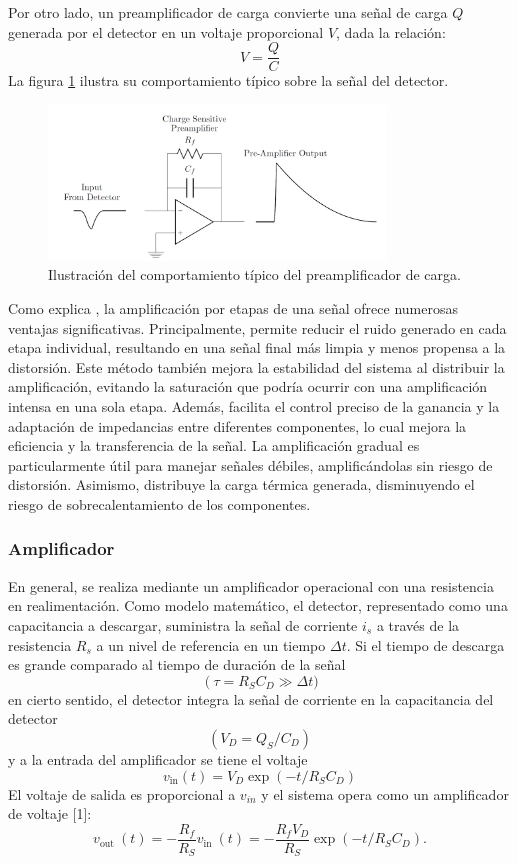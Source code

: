 \documentclass[]{book}
\begin{document}
\noindent Por otro lado, un preamplificador de carga convierte una señal de carga $Q$ generada por el detector en un voltaje proporcional $V$, dada la relación: $$V = \frac{Q}{C}$$ La figura \ref{fig:preamp} ilustra su comportamiento típico sobre la señal del detector.\\

\begin{figure}[h]
    \centering
    \includegraphics[width=0.8\textwidth]{preamp.PNG}
    \caption{Ilustración del comportamiento típico del preamplificador de carga.}
    \label{fig:preamp}

\end{figure}

\noindent Como explica \cite{proakis2007digital}, la amplificación por etapas de una señal ofrece numerosas ventajas significativas. Principalmente, permite reducir el ruido generado en cada etapa individual, resultando en una señal final más limpia y menos propensa a la distorsión. Este método también mejora la estabilidad del sistema al distribuir la amplificación, evitando la saturación que podría ocurrir con una amplificación intensa en una sola etapa. Además, facilita el control preciso de la ganancia y la adaptación de impedancias entre diferentes componentes, lo cual mejora la eficiencia y la transferencia de la señal. La amplificación gradual es particularmente útil para manejar señales débiles, amplificándolas sin riesgo de distorsión. Asimismo, distribuye la carga térmica generada, disminuyendo el riesgo de sobrecalentamiento de los componentes. \\

\subsubsection{Amplificador}

\noindent En general, se realiza mediante un amplificador operacional con una resistencia en realimentación. Como modelo matemático, el detector, representado como una capacitancia a descargar, suministra la señal de corriente $i_{s}$ a través de la resistencia $R_{s}$ a un nivel de referencia en un tiempo $\Delta t$. Si el tiempo de descarga es grande comparado al tiempo de duración de la señal $$\left(\tau=R_S C_D \gg\right. \Delta t)$$ en cierto sentido, el detector integra la señal de corriente en la capacitancia del detector $$\left(V_D=Q_S / C_D\right)$$ y a la entrada del amplificador se tiene el voltaje $$v_{\text{in}}(t)=V_D \exp \left(-t / R_S C_D\right)$$ El voltaje de salida es proporcional a $v_{i n}$ y el sistema opera como un amplificador de voltaje [1]:
$$
v_{\text {out }}(t)=-\frac{R_f}{R_S} v_{\text {in }}(t)=-\frac{R_f V_D}{R_S} \exp \left(-t / R_S C_D\right) .
$$
\end{document}
